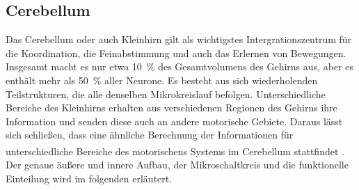 \documentclass[12pt,a4paper,pdftex]{article}
\begin{document}
\subsection{Cerebellum} \label{sub:kleinhirn} 
Das Cerebellum oder auch Kleinhirn gilt als wichtigstes Intergrationszentrum für die Koordination, die Feinabstimmung und auch das Erlernen von Bewegungen. Insgesamt macht es nur etwa 10~\% des Gesamtvolumens des Gehirns aus, aber es enthält mehr als 50~\% aller Neurone. Es besteht aus sich wiederholenden Teilstrukturen, die alle denselben Mikrokreislauf befolgen. Unterschiedliche Bereiche des Kleinhirns erhalten aus verschiedenen Regionen des Gehirns ihre Information und senden diese auch an andere motorische Gebiete. Daraus lässt sich schließen, dass eine ähnliche Berechnung der Informationen für unterschiedliche Bereiche des motorischens Systems im Cerebellum stattfindet \textsuperscript{\cite[42]{kandel2013principles}}. Der genaue äußere und innere Aufbau, der Mikroschaltkreis und die funktionelle Einteilung wird im folgenden erläutert.    
\end{document}
